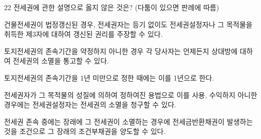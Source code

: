 \begin{question}{22}
전세권에 관한 설명으로 옳지 않은 것은? (다툼이 있으면 판례에 따름)
\begin{choices}
  \item 건물전세권이 법정갱신된 경우, 전세권자는 등기 없이도 전세권설정자나 그 목적물을 취득한 제3자에 대하여 갱신된 권리를 주장할 수 있다.
  \item 토지전세권의 존속기간을 약정하지 아니한 경우 각 당사자는 언제든지 상대방에 대하여 전세권의 소멸을 통고할 수 있다.
  \item 토지전세권의 존속기간을 1년 미만으로 정한 때에는 이를 1년으로 한다.
  \item 전세권자가 그 목적물의 성질에 의하여 정하여진 용법으로 이를 사용, 수익하지 아니한 경우에는 전세권설정자는 전세권의 소멸을 청구할 수 있다.
  \item 전세권 존속 중에는 장래에 그 전세권이 소멸하는 경우에 전세금반환채권이 발생하는 것을 조건으로 그 장래의 조건부채권을 양도할 수 있다.
\end{choices}
\end{question}
